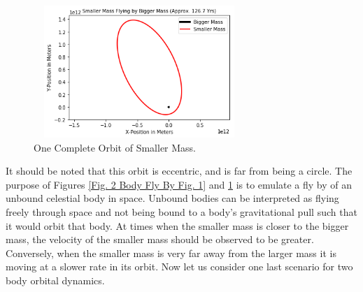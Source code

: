 \documentclass[twocolumn]{article}
\begin{document}
\begin{figure}[ht]
    \centering
    \includegraphics[width=8cm, height=5cm]{Figures/2-Body Fly By (2).png}
    \caption{\small{One Complete Orbit of Smaller Mass.}}
    \label{Fig. 2 Body Fly By Fig. 2}
\end{figure}
\par \noindent
It should be noted that this orbit is eccentric, and is far from being a circle. The purpose of Figures \ref{Fig. 2 Body Fly By Fig. 1} and \ref{Fig. 2 Body Fly By Fig. 2} is to emulate a fly by of an unbound celestial body in space. Unbound bodies can be interpreted as flying freely through space and not being bound to a body's gravitational pull such that it would orbit that body. At times when the smaller mass is closer to the bigger mass, the velocity of the smaller mass should be observed to be greater. Conversely, when the smaller mass is very far away from the larger mass it is moving at a slower rate in its orbit. Now let us consider one last scenario for two body orbital dynamics.
\end{document}
